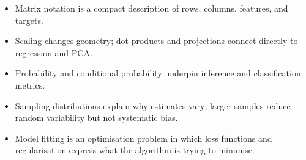 \begin{chapterrecap}
\begin{itemize}
  \item Matrix notation is a compact description of rows, columns, features, and targets.
  \item Scaling changes geometry; dot products and projections connect directly to regression and PCA.
  \item Probability and conditional probability underpin inference and classification metrics.
  \item Sampling distributions explain why estimates vary; larger samples reduce random variability but not systematic bias.
  \item Model fitting is an optimisation problem in which loss functions and regularisation express what the algorithm is trying to minimise.
\end{itemize}
\end{chapterrecap}
